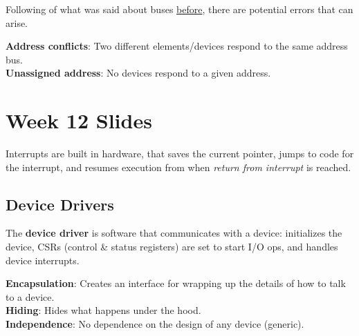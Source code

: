 \documentclass[11pt]{article}
\begin{document}
Following of what was said about buses \hyperref[jmp:buses-general]{before}, there are potential errors that can arise.

\begin{tcolorbox}[
    enhanced,
    attach boxed title to top left={xshift=6mm,yshift=-1.5mm},
    colback=moonstoneblue!20,
    colframe=moonstoneblue,
    colbacktitle=moonstoneblue,
    title=Bus errors,
    fonttitle=\bfseries\color{white},
    boxed title style={size=small,colframe=moonstoneblue,sharp corners},
    sharp corners,
    label=box:logic-types,
]
    {\color{moondark}\textbf{Address conflicts}}: Two different elements/devices respond to the same address bus. \\
    {\color{moondark}\textbf{Unassigned address}}: No devices respond to a given address.
\end{tcolorbox}

\pagebreak
\section*{Week 12 Slides}

Interrupts are built in hardware, that saves the current pointer, jumps to code for the interrupt, and resumes execution from when \textit{return from interrupt} is reached.

\subsection*{Device Drivers}

The \textbf{device driver} is software that communicates with a device: initializes the device, CSRs (control \& status registers) are set to start I/O ops, and handles device interrupts.

\begin{tcolorbox}[
    enhanced,
    attach boxed title to top left={xshift=6mm,yshift=-1.5mm},
    colback=moonstoneblue!20,
    colframe=moonstoneblue,
    colbacktitle=moonstoneblue,
    title=Purpose of Device Drivers,
    fonttitle=\bfseries\color{white},
    boxed title style={size=small,colframe=moonstoneblue,sharp corners},
    sharp corners,
    label=box:logic-types,
]
    {\color{moondark}\textbf{Encapsulation}}: Creates an interface for wrapping up the details of how to talk to a device. \\
    {\color{moondark}\textbf{Hiding}}: Hides what happens under the hood. \\
    {\color{moondark}\textbf{Independence}}: No dependence on the design of any device (generic).
\end{tcolorbox}
\end{document}
